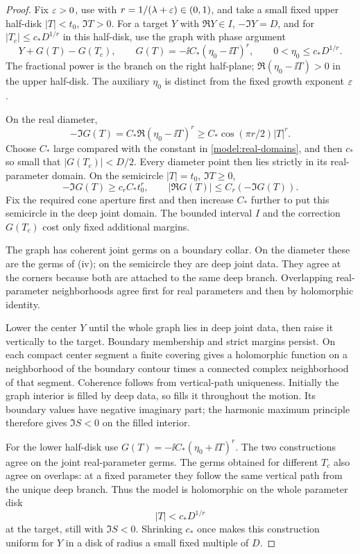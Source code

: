 \begin{proof}
Fix \(\varepsilon>0\), use  with
\(r=1/(\lambda+\varepsilon)\in(0,1)\), and take a small fixed upper
half-disk \(|T|<t_0\), \(\Im T>0\).
For a target \(Y\) with \(\Re Y\in I\), \(-\Im Y=D\),
and for \(|T_c|\le c_*D^{1/r}\) in this half-disk, use the
graph with phase argument
\begin{equation}
\label{model:parameter-graph}
 Y+G(T)-G(T_c),\qquad
 G(T)=-\ii C_*(\eta_0-\ii T)^r,\qquad
 0<\eta_0\le c_*D^{1/r}.
\end{equation}
The fractional power is the branch on the right half-plane;
\(\Re(\eta_0-\ii T)>0\) in the upper half-disk.
The auxiliary \(\eta_0\) is distinct from the fixed
growth exponent \(\varepsilon\).

On the real diameter,
\[
 -\Im G(T)=C_*\Re(\eta_0-\ii T)^r
       \ge C_*\cos(\pi r/2)|T|^r.
\]
Choose \(C_*\) large compared with the constant in
\eqref{model:real-domains}, and then \(c_*\) so small that
\(|G(T_c)|<D/2\).  Every diameter point then lies strictly
in its real-parameter domain.  On the semicircle
\(|T|=t_0\), \(\Im T\ge0\),
\[
 -\Im G(T)\ge c_rC_*t_0^r,\qquad
 |\Re G(T)|\le C_r(-\Im G(T)).
\]
Fix the required cone aperture first and then increase
\(C_*\) further to put this semicircle in the deep joint
domain.  The bounded interval \(I\) and the correction
\(G(T_c)\) cost only fixed additional margins.

The graph has coherent joint germs on a boundary collar.
On the diameter these are the germs of
\textup{(iv)}; on the semicircle they
are deep joint data.  They agree at the corners because
both are attached to the same deep branch.  Overlapping
real-parameter neighborhoods agree first for real parameters
and then by holomorphic identity.

Lower the center \(Y\) until the whole graph lies in deep
joint data, then raise it vertically to the target.
Boundary membership and strict margins persist.  On each
compact center segment a finite covering gives a holomorphic
function on a neighborhood of the boundary contour times
a connected complex neighborhood of that segment.
Coherence follows from vertical-path uniqueness.  Initially
the graph interior is filled by deep data, so
 fills it throughout the motion.
Its boundary values have negative imaginary part; the
harmonic maximum principle therefore gives \(\Im S<0\)
on the filled interior.

For the lower half-disk use
\(G(T)=-\ii C_*(\eta_0+\ii T)^r\).
The two constructions agree on the joint real-parameter
germs.  The germs obtained for different \(T_c\) also agree
on overlaps: at a fixed parameter they follow the same
vertical path from the unique deep branch.  Thus the
model is holomorphic on the whole parameter disk
\begin{equation}
\label{model:small-parameter-disk}
 |T|<c_*D^{1/r}
\end{equation}
at the target, still with \(\Im S<0\).
Shrinking \(c_*\) once makes this construction uniform
for \(Y\) in a disk of radius a small fixed multiple of \(D\).


\end{proof}
